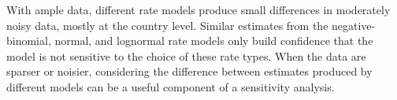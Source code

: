 With ample data, different rate models produce small differences in
moderately noisy data, mostly at the country level.  Similar estimates
from the negative-binomial, normal, and lognormal rate models only
build confidence that the model is not sensitive to the choice of these
rate types.  When the data are sparser or noisier, considering the
difference between estimates produced by different models can be a
useful component of a sensitivity analysis.
